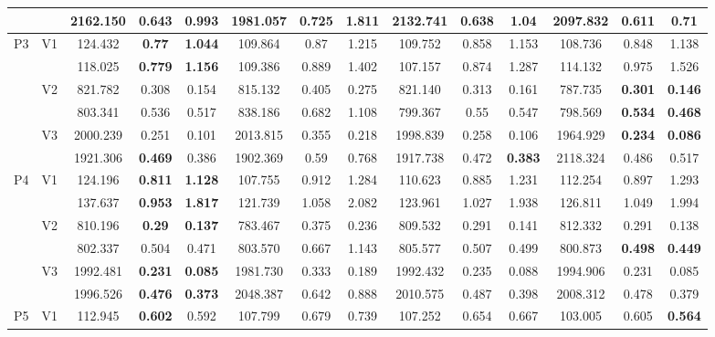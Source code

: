 \documentclass[12pt,a4paper]{article}
\begin{document}
\begin{sidewaystable}[ht]
{\begin{tabular}{cc|ccc|ccc|ccc|ccc|}
   &  & 2162.150 & 0.643 & 0.993 & 1981.057 & 0.725 & 1.811 & 2132.741 & 0.638 & 1.04 & 2097.832 & \textbf{0.611} & \textbf{0.71} \\ 
   \hline \hline\multirow{6}{*}{P3} & \multirow{2}{*}{V1} & 124.432 & \textbf{0.77} & \textbf{1.044} & 109.864 & 0.87 & 1.215 & 109.752 & 0.858 & 1.153 & 108.736 & 0.848 & 1.138 \\ 
   &  & 118.025 & \textbf{0.779} & \textbf{1.156} & 109.386 & 0.889 & 1.402 & 107.157 & 0.874 & 1.287 & 114.132 & 0.975 & 1.526 \\ 
   & \multirow{2}{*}{V2} & 821.782 & 0.308 & 0.154 & 815.132 & 0.405 & 0.275 & 821.140 & 0.313 & 0.161 & 787.735 & \textbf{0.301} & \textbf{0.146} \\ 
   &  & 803.341 & 0.536 & 0.517 & 838.186 & 0.682 & 1.108 & 799.367 & 0.55 & 0.547 & 798.569 & \textbf{0.534} & \textbf{0.468} \\ 
   & \multirow{2}{*}{V3} & 2000.239 & 0.251 & 0.101 & 2013.815 & 0.355 & 0.218 & 1998.839 & 0.258 & 0.106 & 1964.929 & \textbf{0.234} & \textbf{0.086} \\ 
   &  & 1921.306 & \textbf{0.469} & 0.386 & 1902.369 & 0.59 & 0.768 & 1917.738 & 0.472 & \textbf{0.383} & 2118.324 & 0.486 & 0.517 \\ 
   \hline \hline\multirow{6}{*}{P4} & \multirow{2}{*}{V1} & 124.196 & \textbf{0.811} & \textbf{1.128} & 107.755 & 0.912 & 1.284 & 110.623 & 0.885 & 1.231 & 112.254 & 0.897 & 1.293 \\ 
   &  & 137.637 & \textbf{0.953} & \textbf{1.817} & 121.739 & 1.058 & 2.082 & 123.961 & 1.027 & 1.938 & 126.811 & 1.049 & 1.994 \\ 
   & \multirow{2}{*}{V2} & 810.196 & \textbf{0.29} & \textbf{0.137} & 783.467 & 0.375 & 0.236 & 809.532 & 0.291 & 0.141 & 812.332 & 0.291 & 0.138 \\ 
   &  & 802.337 & 0.504 & 0.471 & 803.570 & 0.667 & 1.143 & 805.577 & 0.507 & 0.499 & 800.873 & \textbf{0.498} & \textbf{0.449} \\ 
   & \multirow{2}{*}{V3} & 1992.481 & \textbf{0.231} & \textbf{0.085} & 1981.730 & 0.333 & 0.189 & 1992.432 & 0.235 & 0.088 & 1994.906 & 0.231 & 0.085 \\ 
   &  & 1996.526 & \textbf{0.476} & \textbf{0.373} & 2048.387 & 0.642 & 0.888 & 2010.575 & 0.487 & 0.398 & 2008.312 & 0.478 & 0.379 \\ 
   \hline \hline\multirow{6}{*}{P5} & \multirow{2}{*}{V1} & 112.945 & \textbf{0.602} & 0.592 & 107.799 & 0.679 & 0.739 & 107.252 & 0.654 & 0.667 & 103.005 & 0.605 & \textbf{0.564} \\ 

\end{tabular}}
\end{sidewaystable}
\end{document}
